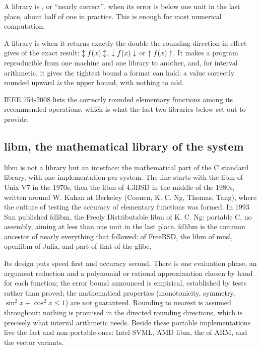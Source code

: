 \documentclass[12pt,a4paper,twoside,openright]{book}
\begin{document}
\begin{Def}\label{def:faithful}
A library is , or ``nearly correct'', when its
error is below one unit in the last place, about half of one in practice.
This is enough for most numerical computation.
\end{Def}

\begin{Def}\label{def:correct-rounding}
A library is  when it returns exactly the double the
rounding direction in effect gives of the exact result:
$\updownarrow f(x)\updownarrow$, $\downarrow f(x)\downarrow$ or $\uparrow f(x)\uparrow$. It makes a
program reproducible from one machine and one library to another, and, for
interval arithmetic, it gives the tightest bound a format can hold: a value
correctly rounded upward \emph{is} the upper bound, with nothing to add.
\end{Def}

\noindent IEEE 754-2008 lists the correctly rounded elementary functions
among its recommended operations, which is what the last two libraries
below set out to provide.

\subsection{libm, the mathematical library of the system}

libm is not a library but an interface: the mathematical part of the C
standard library, with one implementation per system. The line starts with
the libm of Unix V7 in the 1970s, then the libm of 4.3BSD in the middle of
the 1980s, written around W. Kahan at Berkeley (Coonen, K. C. Ng, Thomas,
Tang), where the culture of testing the accuracy of elementary functions
was formed. In 1993 Sun published fdlibm, the Freely Distributable libm of
K. C. Ng: portable C, no assembly, aiming at less than one unit in the last
place. fdlibm is the common ancestor of nearly everything that followed:
 of FreeBSD, the libm of musl, openlibm of Julia, and part of
that of the glibc.

\medskip
Its design puts speed first and accuracy second. There is one evaluation
phase, an argument reduction and a polynomial or rational approximation
chosen by hand for each function; the error bound announced is empirical,
established by tests rather than proved; the mathematical properties
(monotonicity, symmetry, $\sin^2x+\cos^2x\leq1$) are not guaranteed.
Rounding to nearest is assumed throughout: nothing is promised in the
directed rounding directions, which is precisely what interval arithmetic
needs. Beside these portable implementations live the fast and
non-portable ones: Intel SVML, AMD libm, the  of
ARM, and the vector variants.
\end{document}
